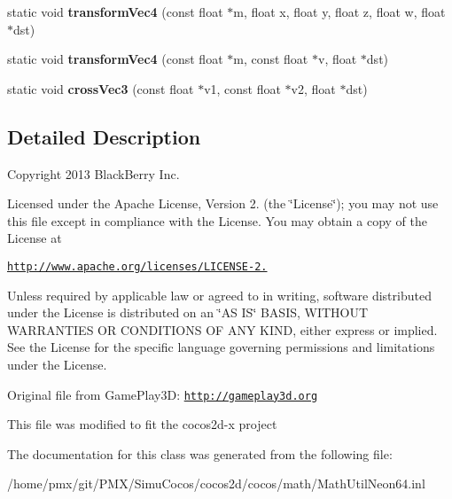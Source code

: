 \begin{DoxyCompactItemize}
\item 
\mbox{\label{classMathUtilNeon64_a95b69d84b3fc67515f3613baeda39708}} 
static void {\bfseries transform\+Vec4} (const float $\ast$m, float x, float y, float z, float w, float $\ast$dst)
\item 
\mbox{\label{classMathUtilNeon64_aca4e1cf76c78f955ee4b242d8691569e}} 
static void {\bfseries transform\+Vec4} (const float $\ast$m, const float $\ast$v, float $\ast$dst)
\item 
\mbox{\label{classMathUtilNeon64_a9c1bb12b8b52d24a295acfd1de7de5b6}} 
static void {\bfseries cross\+Vec3} (const float $\ast$v1, const float $\ast$v2, float $\ast$dst)
\end{DoxyCompactItemize}


\subsection{Detailed Description}
Copyright 2013 Black\+Berry Inc.

Licensed under the Apache License, Version 2. (the \char`\"{}\+License\char`\"{}); you may not use this file except in compliance with the License. You may obtain a copy of the License at

\href{http://www.apache.org/licenses/LICENSE-2.0}{\tt http\+://www.\+apache.\+org/licenses/\+L\+I\+C\+E\+N\+S\+E-\/2.}

Unless required by applicable law or agreed to in writing, software distributed under the License is distributed on an \char`\"{}\+A\+S I\+S\char`\"{} B\+A\+S\+IS, W\+I\+T\+H\+O\+UT W\+A\+R\+R\+A\+N\+T\+I\+ES OR C\+O\+N\+D\+I\+T\+I\+O\+NS OF A\+NY K\+I\+ND, either express or implied. See the License for the specific language governing permissions and limitations under the License.

Original file from Game\+Play3D\+: \href{http://gameplay3d.org}{\tt http\+://gameplay3d.\+org}

This file was modified to fit the cocos2d-\/x project 

The documentation for this class was generated from the following file\+:\begin{DoxyCompactItemize}
\item 
/home/pmx/git/\+P\+M\+X/\+Simu\+Cocos/cocos2d/cocos/math/Math\+Util\+Neon64.\+inl\end{DoxyCompactItemize}
